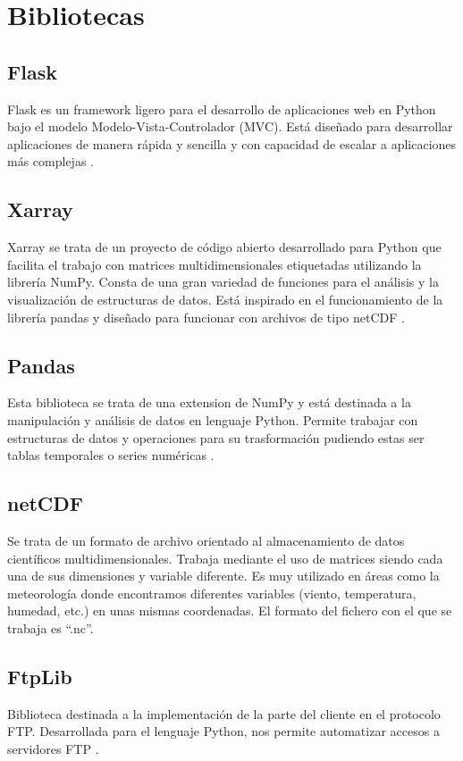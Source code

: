 \section{Bibliotecas}\label{librerias}
	\subsection{Flask}\label{Flask}
Flask es un framework ligero para el desarrollo de aplicaciones web en Python bajo el modelo Modelo-Vista-Controlador (MVC). Está diseñado para desarrollar aplicaciones de manera rápida y sencilla y con capacidad de escalar a aplicaciones más complejas \cite{flask}.
	\subsection{Xarray}\label{xarray}
Xarray se trata de un proyecto de código abierto desarrollado para Python que facilita el trabajo con matrices multidimensionales etiquetadas utilizando la librería NumPy. Consta de una gran variedad de funciones para el análisis y la visualización de estructuras de datos. Está inspirado en el funcionamiento de la librería pandas y diseñado para funcionar con archivos de tipo netCDF \cite{xarray}.	
	\subsection{Pandas}\label{pandas}
Esta biblioteca se trata de una extension de NumPy y está destinada a la manipulación y análisis de datos en lenguaje Python. Permite trabajar con estructuras de datos y operaciones para su trasformación pudiendo estas ser tablas temporales o series numéricas \cite{pandas}.
	\subsection{netCDF}
Se trata de un formato de archivo orientado al almacenamiento de datos científicos multidimensionales. Trabaja mediante el uso de matrices siendo cada una de sus dimensiones y variable diferente. Es muy utilizado en áreas como la meteorología donde encontramos diferentes variables (viento, temperatura, humedad, etc.) en unas mismas coordenadas. El formato del fichero con el que se trabaja es ``.nc''. \cite{netCDF}
	\subsection{FtpLib}\label{FtpLib}
Biblioteca destinada a la implementación de la parte del cliente en el protocolo FTP. Desarrollada para el lenguaje Python, nos permite automatizar accesos a servidores FTP \cite{ftp_lib}.
